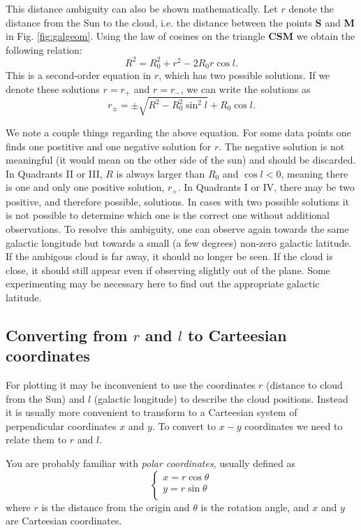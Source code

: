 This distance ambiguity can also be shown mathematically. Let $r$ denote the
distance from the Sun to the cloud, i.e. the distance between the points {\bf
S} and {\bf M} in  Fig.  \ref{fig:galgeom}. Using the law of cosines on the triangle
{\bf CSM} we obtain the following relation:
\begin{equation}
R^2 = R_0^2 + r^2 - 2 R_0 r \cos l.
\end{equation}
This is a second-order equation in $r$, which has two possible solutions. If we
denote these solutions $r=r_{+}$ and $r=r_{-}$, we can write the solutions as
\begin{equation}
\boxed{
r_\pm = \pm \sqrt{R^2 - R_0^2 \sin^2 l} + R_0\cos l .
}
\label{eqn:rpm}
\end{equation}

We note a couple things regarding the above equation. For some data points one
finds one postitive and one negative solution for $r$. The negative solution is
not meaningful (it would mean on the other side of the sun) and should be
discarded.  In Quadrants II or III, $R$ is always larger than $R_0$ and $\cos l
<0$, meaning there is one and only one positive solution, $r_+$.  In Quadrants
I or IV, there may be two positive, and therefore possible, solutions. In cases
with two possible solutions it is not possible to determine which one is the
correct one without additional observations.  To resolve this ambiguity, one
can observe again towards the same galactic longitude but towards a small (a
few degrees) non-zero galactic latitude.  If the ambigous cloud is far away, it
should no longer be seen. If the cloud is close, it should still appear even if
observing slightly out of the plane.  Some experimenting may be necessary here
to find out the appropriate galactic latitude.

\subsection{Converting from $r$ and $l$ to Carteesian coordinates} 
For plotting it may be inconvenient to use the coordinates $r$ (distance to
cloud from the Sun) and $l$ (galactic longitude) to describe the cloud
positions. Instead it is usually more convenient to transform to a Carteesian
system of perpendicular coordinates $x$ and $y$.  To convert to $x-y$
coordinates we need to relate them to $r$ and $l$.  

You are probably familiar with \emph{polar coordinates}, usually defined as
\begin{equation}
\left\{ 
\begin{array}{l}
x=r \cos \theta \\
y=r \sin \theta \\
\end{array}
\right.
\label{eqn:polar}
\end{equation} 
where $r$ is the distance from the origin and $\theta$ is the rotation angle, and 
$x$ and $y$ are Carteesian coordinates. 

